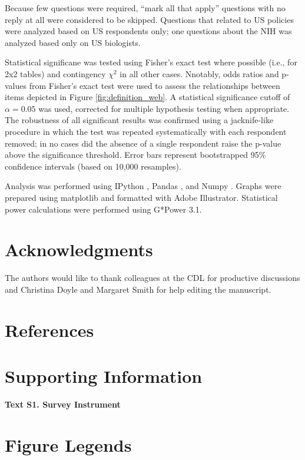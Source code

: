 \documentclass[10pt]{article}
\begin{document}
Because few questions were required,  ``mark all that apply'' questions with no reply at all were considered to be skipped.
Questions that related to US policies were analyzed based on US respondents only; one questions about the NIH was analyzed based only on US biologists.

Statistical significane was tested using Fisher's exact test where possible (i.e., for 2x2 tables) and contingency $\chi^{2}$ in all other cases\cite{agresti_statistical_1992}.
Nnotably, odds ratios\cite{szumilas_explaining_2010} and p-values from Fisher's exact test were used to assess the relationships between items depicted in Figure \ref{fig:definition_web}.
A statistical significance cutoff of $\alpha=0.05$ was used, corrected for multiple hypothesis testing when appropriate.
The robustness of all significant results was confirmed using a jacknife-like procedure in which the test was repeated systematically with each respondent removed; in no cases did the absence of a single respondent raise the p-value above the significance threshold.
Error bars represent bootstrapped 95\% confidence intervals (based on 10,000 resamples)\cite{efron_bootstrap_1979}.


Analysis was performed using IPython \cite{perez_ipython:_2007}, Pandas \cite{mckinney_data_2010}, and Numpy \cite{van_der_walt_numpy_2011}.
Graphs were prepared using matplotlib \cite{hunter_matplotlib:_2007} and formatted with Adobe Illustrator.
Statistical power calculations were performed using G*Power 3.1\cite{faul_g*_2007}.


\section*{Acknowledgments}
The authors would like to thank colleagues at the CDL for productive discussions and Christina Doyle and Margaret Smith for help editing the manuscript.


\section*{References}



\section*{Supporting Information}
{\bf Text S1. Survey Instrument}


\section*{Figure Legends}
\end{document}
